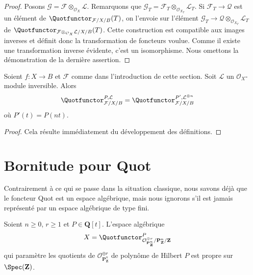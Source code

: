 \begin{proof}
Posons $\mathcal{G} = \mathcal{F} \otimes_{\mathcal{O}_X} \mathcal{L}$.
Remarquons que
$\mathcal{G}_T = \mathcal{F}_T \otimes_{\mathcal{O}_{X_T}}
\mathcal{L}_T$.
Si $\mathcal{F}_T \to \mathcal{Q}$ est un élément de
$\Quotfunctor_{\mathcal{F}/X/B}(T)$, on l'envoie sur l'élément
$\mathcal{G}_T \to
\mathcal{Q} \otimes_{\mathcal{O}_{X_T}} \mathcal{L}_T$
de $\Quotfunctor_{\mathcal{F} \otimes_{\mathcal{O}_X}
\mathcal{L}/X/B}(T)$.
Cette construction est compatible aux images inverses et définit donc la
transformation de foncteurs voulue. Comme il existe une transformation
inverse évidente, c'est un isomorphisme. Nous omettons la démonstration de
la dernière assertion.
\end{proof}

\begin{lemma}
\label{lemma-quot-power-invertible}
Soient $f : X \to B$ et $\mathcal{F}$ comme dans l'introduction de cette
section. Soit $\mathcal{L}$ un $\mathcal{O}_X$-module inversible.
Alors
$$
\Quotfunctor^{P, \mathcal{L}}_{\mathcal{F}/X/B} =
\Quotfunctor^{P', \mathcal{L}^{\otimes n}}_{\mathcal{F}/X/B}
$$
où $P'(t) = P(nt)$.
\end{lemma}

\begin{proof}
Cela résulte immédiatement du développement des définitions.
\end{proof}

\section{Bornitude pour Quot}
\label{section-quot-bounded}

\noindent
Contrairement à ce qui se passe dans la situation classique, nous savons
déjà que le foncteur Quot est un espace algébrique, mais nous ignorons s'il
est jamais représenté par un espace algébrique de type fini.

\begin{lemma}
\label{lemma-quot-Pn}
Soient $n \geq 0$, $r \geq 1$ et $P \in \mathbf{Q}[t]$.
L'espace algébrique
$$
X = \Quotfunctor^P_{\mathcal{O}^{\oplus r}_{\mathbf{P}^n_\mathbf{Z}}/
\mathbf{P}^n_\mathbf{Z}/\mathbf{Z}}
$$
qui paramètre les quotients de
$\mathcal{O}_{\mathbf{P}^n_\mathbf{Z}}^{\oplus r}$ de polynôme de Hilbert
$P$ est propre sur $\Spec(\mathbf{Z})$.
\end{lemma}

